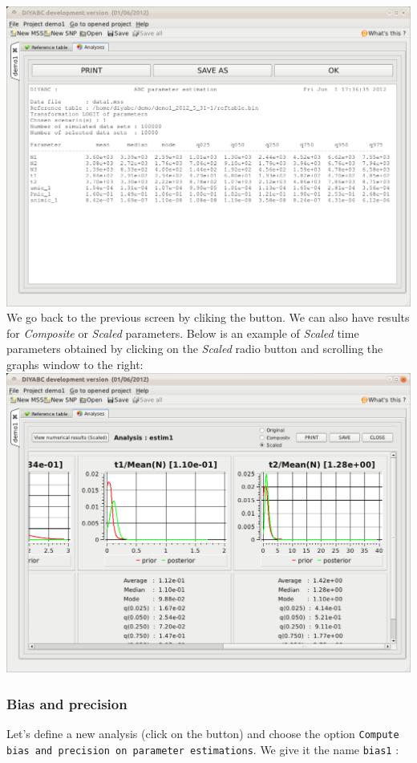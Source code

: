 \includegraphics[scale=0.35]{gui_pictures/Capture-DIYABC-41.png} \\

We go back to the previous screen by cliking the  button.
\newpage
 We can also have results for \emph{Composite} or \emph{Scaled} parameters. Below is an example of \emph{Scaled} time parameters obtained by clicking on the \emph{Scaled} radio button and scrolling the graphs window to the right:\\
 
\includegraphics[scale=0.35]{gui_pictures/Capture-DIYABC-42.png} \\


\subsubsection{Bias and precision}
Let's define a new analysis (click on the  button) and choose the option \texttt{Compute bias and precision on parameter estimations}. We give it the name \texttt{bias1} :\\

